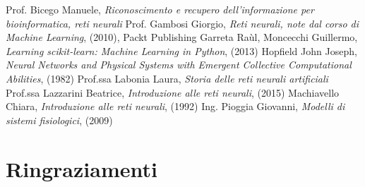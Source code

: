 \documentclass[12pt,a4paper,oneside]{book}
\begin{document}
\begin{thebibliography}{9} 
	 Prof. Bicego Manuele, \emph{Riconoscimento e recupero dell’informazione per bioinformatica, reti neurali}
	 Prof. Gambosi Giorgio, \emph{Reti neurali, note dal corso di Machine Learning}, (2010), Packt Publishing 
	 Garreta Raùl, Moncecchi Guillermo, \emph{Learning scikit-learn: Machine Learning in Python}, (2013) 
	 Hopfield John Joseph, \emph{Neural Networks and Physical Systems with Emergent Collective Computational Abilities}, (1982)
	 Prof.ssa Labonia Laura, \emph{Storia delle reti neurali artificiali}
	 Prof.ssa Lazzarini Beatrice, \emph{Introduzione alle reti neurali}, (2015)
	 Machiavello Chiara, \emph{Introduzione alle reti neurali}, (1992)
	 Ing. Pioggia Giovanni, \emph{Modelli di sistemi fisiologici}, (2009)
	
 \end{thebibliography}
	
\chapter*{Ringraziamenti}
\end{document}
